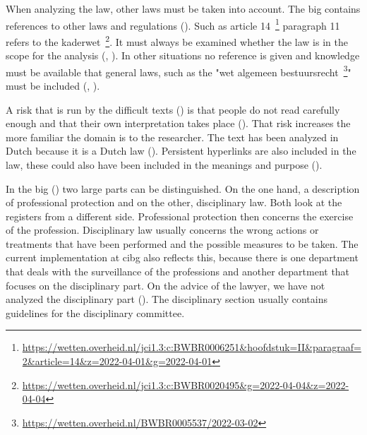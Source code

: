 When analyzing the law, other laws must be taken into account.
The \acrshort{big} contains references to other laws and regulations ().
Such as article 14~\footnote{\url{https://wetten.overheid.nl/jci1.3:c:BWBR0006251&hoofdstuk=II&paragraaf=2&article=14&z=2022-04-01&g=2022-04-01}} paragraph 11 refers to the kaderwet~\footnote{\url{https://wetten.overheid.nl/jci1.3:c:BWBR0020495&g=2022-04-04&z=2022-04-04}}.
It must always be examined whether the law is in the scope for the analysis (, ).
In other situations no reference is given and knowledge must be available that general laws, such as the "wet algemeen bestuursrecht~\footnote{\url{https://wetten.overheid.nl/BWBR0005537/2022-03-02} }" must be included (, ).
\label{s:6_2_law}

A risk that is run by the difficult texts () is that people do not read carefully enough and that their own interpretation takes place ().
That risk increases the more familiar the domain is to the researcher.
The text has been analyzed in Dutch because it is a Dutch law ().
Persistent hyperlinks are also included in the law, these could also have been included in the meanings and purpose ().
\label{s:6_3_parts}

In the \acrshort{big} () two large parts can be distinguished.
On the one hand, a description of professional protection and on the other, disciplinary law.
Both look at the registers from a different side.
Professional protection then concerns the exercise of the profession.
Disciplinary law usually concerns the wrong actions or treatments that have been performed and the possible measures to be taken.
The current implementation at \acrshort{cibg} also reflects this, because there is one department that deals with the surveillance of the professions and another department that focuses on the disciplinary part.
On the advice of the lawyer, we have not analyzed the disciplinary part ().
The disciplinary section usually contains guidelines for the disciplinary committee.
\label{s:6_4_tools}

